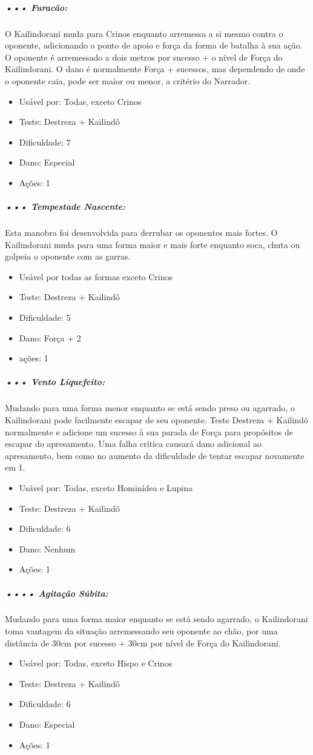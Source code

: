 \subparagraph{\bf ••• Furacão:}
O Kailindorani muda para Crinos enquanto arremessa a si mesmo contra o oponente, adicionando o ponto de apoio e força da forma de batalha à sua ação. O oponente é arremessado a dois metros por sucesso + o nível de Força do Kailindorani. O dano é normalmente Força + sucessos, mas dependendo de onde o oponente caia, pode ser maior ou menor, a critério do Narrador.
\begin{itemize}[noitemsep]
\item Usável por: Todas, exceto Crinos
\item Teste: Destreza + Kailindô 
\item Dificuldade: 7
\item Dano: Especial 
\item Ações: 1
\end{itemize}

\subparagraph{\bf ••• Tempestade Nascente:}
Esta manobra foi desenvolvida para derrubar os oponentes mais fortes. O Kailindorani muda para uma forma maior e mais forte enquanto soca, chuta ou golpeia o oponente com as garras.
\begin{itemize}[noitemsep]
\item Usável por todas as formas exceto Crinos
\item Teste: Destreza + Kailindô	
\item Dificuldade: 5
\item Dano: Força + 2	
\item ações: 1
\end{itemize}

\subparagraph{\bf ••• Vento Liquefeito:}
Mudando para uma forma menor enquanto se está sendo preso ou agarrado, o Kailindorani pode facilmente escapar de seu oponente. Teste Destreza + Kailindô normalmente e adicione um sucesso à sua parada de Força para propósitos de escapar do apresamento. Uma falha crítica causará dano adicional ao apresamento, bem como no aumento da dificuldade de tentar escapar novamente em 1.
\begin{itemize}[noitemsep]
\item Usável por: Todas, exceto Hominídea e Lupina
\item Teste: Destreza + Kailindô 
\item Dificuldade: 6
\item Dano: Nenhum 
\item Ações: 1
\end{itemize}

\subparagraph{\bf •••• Agitação Súbita:}
Mudando para uma forma maior enquanto se está sendo agarrado, o Kailindorani toma vantagem da situação arremessando seu oponente ao chão, por uma distância de 30cm por sucesso + 30cm por nível de Força do Kailindorani.
\begin{itemize}[noitemsep]
\item Usável por: Todas, exceto Hispo e Crinos
\item Teste: Destreza + Kailindô 
\item Dificuldade: 6
\item Dano: Especial 
\item Ações: 1
\end{itemize}

